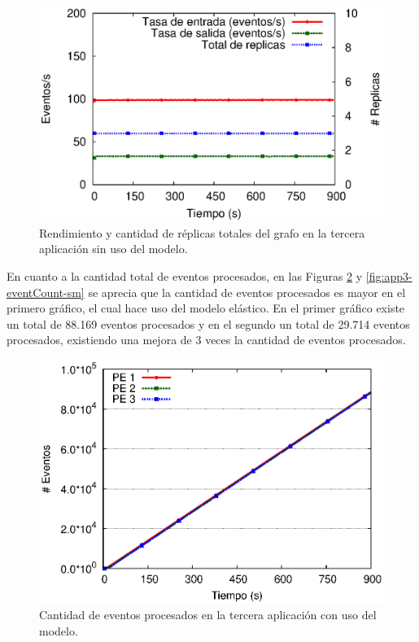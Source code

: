 \begin{figure}[!ht]
	\centering
	\includegraphics[scale=0.7]{images/exp/app3/sm/logical/processSystem.eps}
    \caption{Rendimiento y cantidad de réplicas totales del grafo en la tercera aplicación sin uso del modelo.}
	\label{fig:app3-processSystem-sm}
\end{figure}

En cuanto a la cantidad total de eventos procesados, en las Figuras \ref{fig:app3-eventCount-cm} y \ref{fig:app3-eventCount-sm} se aprecia que la cantidad de eventos procesados es mayor en el primero gráfico, el cual hace uso del modelo elástico. En el primer gráfico existe un total de 88.169 eventos procesados y en el segundo un total de 29.714 eventos procesados, existiendo una mejora de 3 veces la cantidad de eventos procesados.

\clearpage

\begin{figure}[!ht]
\centering
    \includegraphics[scale=0.75]{images/exp/app3/cm/logical/eventCount.eps}
    \caption{Cantidad de eventos procesados en la tercera aplicación con uso del modelo.}
    \label{fig:app3-eventCount-cm}
\end{figure}

